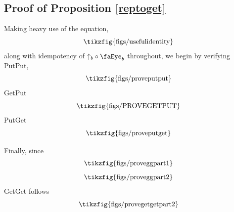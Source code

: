 \documentclass[11pt]{article}
\newcommand{\tikzfigscale}[2]{\scalebox{#1}{\tikzfig{#2}}}
\newcommand{\putt}[1]{\mathbin{\uparrow_{#1}}}
\newcommand{\get}[1]{\operatorname{\text{\faEye}}_{#1}}
\theoremstyle{definition}
\theoremstyle{plain}
\begin{document}
\subsection{Proof of Proposition \ref{reptoget}}
Making heavy use of the equation,
\begin{equation*}
\tikzfigscale{1}{figs/usefulidentity}
\end{equation*}
along with idempotency of $\putt{b} \circ \get{b}$ throughout, we begin by verifying PutPut,
\begin{equation*}
\tikzfigscale{1}{figs/proveputput}
\end{equation*}
GetPut
\begin{equation*}
\tikzfigscale{1}{figs/PROVEGETPUT}
\end{equation*}
PutGet
\begin{equation*}
\tikzfigscale{1}{figs/proveputget}
\end{equation*}

Finally, since
\begin{equation*}
\tikzfigscale{1}{figs/proveggpart1}
\end{equation*}
\begin{equation*}
\tikzfigscale{1}{figs/proveggpart2}
\end{equation*}
GetGet follows
\begin{equation*}
\tikzfigscale{1}{figs/provegetgetpart2}
\end{equation*}


\clearpage



\end{document}
